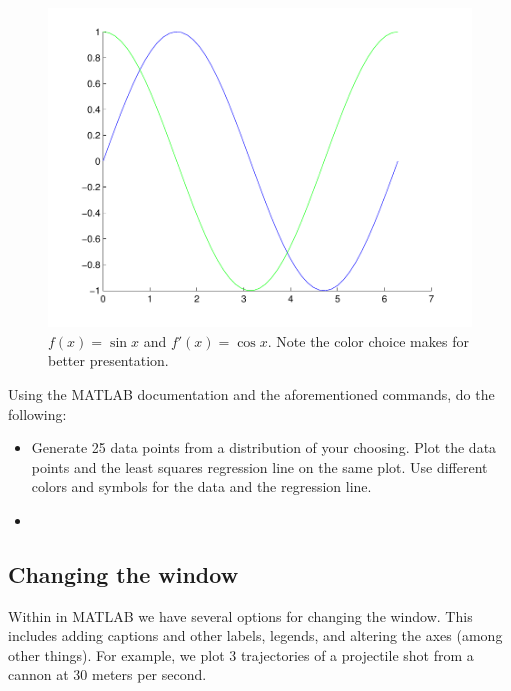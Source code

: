 \begin{figure}
\begin{center}
\begin{matlab}
\includegraphics[scale=0.5]{./FiguresMAT/plot2}
\end{matlab}
\caption{$f(x) = \sin{x}$ and $f'(x) = \cos{x}$. Note the color choice makes for better presentation.}
\end{center}
\end{figure}

\begin{problem}  Using the MATLAB documentation and the aforementioned commands, do the following:
\begin{itemize}
\item Generate 25 data points from a distribution of your choosing.  Plot the data points and the least squares regression line on the same plot.  Use different colors and symbols for the data and the regression line.
\item 
\end{itemize}
\end{problem}

\subsection{Changing the  window}

Within in MATLAB we have several options for changing the  window.  This includes adding captions and other labels, legends, and altering the axes (among other things).  For example, we plot 3 trajectories of a projectile shot from a cannon at 30 meters per second.

